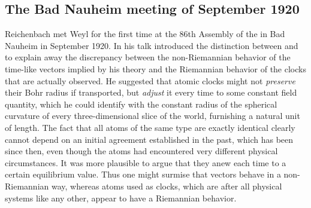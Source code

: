 {%




\subsection{The Bad Nauheim meeting of September 1920}


Reichenbach met Weyl for the first time at the 86th Assembly of the  in Bad Nauheim in September 1920. In his talk \citet{Weyl1920a} introduced the distinction between  and  to explain away the discrepancy between the non-Riemannian behavior of the  time-like vectors implied by his theory and the Riemannian behavior of the  clocks that are actually observed. He suggested that atomic clocks might not \emph{preserve} their Bohr radius if transported, but \emph{adjust} it every time to some constant field quantity, which he could identify with the constant radius of the spherical curvature of every three-dimensional slice of the world, furnishing a natural unit of length. The fact that all atoms of the same type are exactly identical clearly cannot depend on an initial agreement established in the past, which has been  since then, even though the atoms had encountered very different physical circumstances. It was more plausible to argue that they  anew each time to a certain equilibrium value. Thus one might surmise that vectors behave in a non-Riemannian way, whereas atoms used as clocks, which are after all physical systems like any other, appear to have a Riemannian behavior.


}
